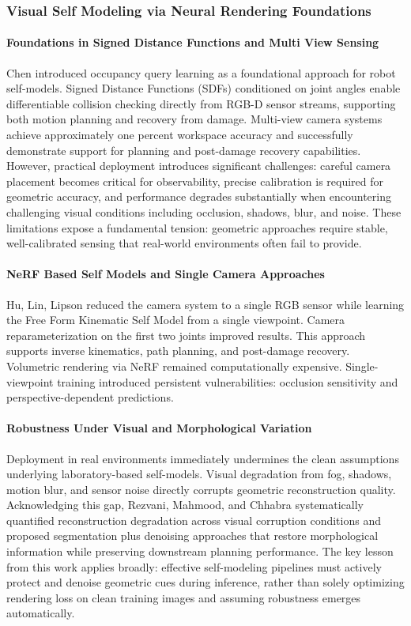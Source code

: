 ﻿\documentclass[11pt,a4paper]{article}
\begin{document}
\subsubsection{Visual Self Modeling via Neural Rendering Foundations}

\paragraph{Foundations in Signed Distance Functions and Multi View Sensing}
Chen introduced occupancy query learning as a foundational approach for robot self-models. Signed Distance Functions (SDFs) conditioned on joint angles enable differentiable collision checking directly from RGB-D sensor streams, supporting both motion planning and recovery from damage. Multi-view camera systems achieve approximately one percent workspace accuracy and successfully demonstrate support for planning and post-damage recovery capabilities. However, practical deployment introduces significant challenges: careful camera placement becomes critical for observability, precise calibration is required for geometric accuracy, and performance degrades substantially when encountering challenging visual conditions including occlusion, shadows, blur, and noise. These limitations expose a fundamental tension: geometric approaches require stable, well-calibrated sensing that real-world environments often fail to provide.

\paragraph{NeRF Based Self Models and Single Camera Approaches}
Hu, Lin, Lipson reduced the camera system to a single RGB sensor while learning the Free Form Kinematic Self Model from a single viewpoint. Camera reparameterization on the first two joints improved results. This approach supports inverse kinematics, path planning, and post-damage recovery. Volumetric rendering via NeRF remained computationally expensive. Single-viewpoint training introduced persistent vulnerabilities: occlusion sensitivity and perspective-dependent predictions.

\paragraph{Robustness Under Visual and Morphological Variation}
Deployment in real environments immediately undermines the clean assumptions underlying laboratory-based self-models. Visual degradation from fog, shadows, motion blur, and sensor noise directly corrupts geometric reconstruction quality. Acknowledging this gap, Rezvani, Mahmood, and Chhabra systematically quantified reconstruction degradation across visual corruption conditions and proposed segmentation plus denoising approaches that restore morphological information while preserving downstream planning performance. The key lesson from this work applies broadly: effective self-modeling pipelines must actively protect and denoise geometric cues during inference, rather than solely optimizing rendering loss on clean training images and assuming robustness emerges automatically.
\end{document}
